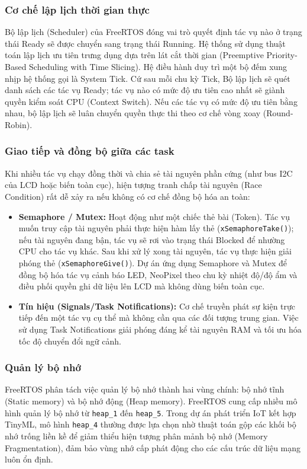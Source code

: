 \subsubsection{Cơ chế lập lịch thời gian thực}
Bộ lập lịch (Scheduler) của FreeRTOS đóng vai trò quyết định tác vụ nào ở trạng thái Ready sẽ được chuyển sang trạng thái Running. Hệ thống sử dụng thuật toán lập lịch ưu tiên trưng dụng dựa trên lát cắt thời gian (Preemptive Priority-Based Scheduling with Time Slicing). Hệ điều hành duy trì một bộ đếm xung nhịp hệ thống gọi là System Tick. Cứ sau mỗi chu kỳ Tick, Bộ lập lịch sẽ quét danh sách các tác vụ Ready; tác vụ nào có mức độ ưu tiên cao nhất sẽ giành quyền kiểm soát CPU (Context Switch). Nếu các tác vụ có mức độ ưu tiên bằng nhau, bộ lập lịch sẽ luân chuyển quyền thực thi theo cơ chế vòng xoay (Round-Robin).

\subsubsection{Giao tiếp và đồng bộ giữa các task}
Khi nhiều tác vụ chạy đồng thời và chia sẻ tài nguyên phần cứng (như bus I2C của LCD hoặc biến toàn cục), hiện tượng tranh chấp tài nguyên (Race Condition) rất dễ xảy ra nếu không có cơ chế đồng bộ hóa an toàn:
\begin{itemize}
    \item \textbf{Semaphore / Mutex:} Hoạt động như một chiếc thẻ bài (Token). Tác vụ muốn truy cập tài nguyên phải thực hiện hàm lấy thẻ (\texttt{xSemaphoreTake()}); nếu tài nguyên đang bận, tác vụ sẽ rơi vào trạng thái Blocked để nhường CPU cho tác vụ khác. Sau khi xử lý xong tài nguyên, tác vụ thực hiện giải phóng thẻ (\texttt{xSemaphoreGive()}). Dự án ứng dụng Semaphore và Mutex để đồng bộ hóa tác vụ cảnh báo LED, NeoPixel theo chu kỳ nhiệt độ/độ ẩm và điều phối quyền ghi dữ liệu lên LCD mà không dùng biến toàn cục.
    \item \textbf{Tín hiệu (Signals/Task Notifications):} Cơ chế truyền phát sự kiện trực tiếp đến một tác vụ cụ thể mà không cần qua các đối tượng trung gian. Việc sử dụng Task Notifications giải phóng đáng kể tài nguyên RAM và tối ưu hóa tốc độ chuyển đổi ngữ cảnh.
\end{itemize}

\subsubsection{Quản lý bộ nhớ}
FreeRTOS phân tách việc quản lý bộ nhớ thành hai vùng chính: bộ nhớ tĩnh (Static memory) và bộ nhớ động (Heap memory). FreeRTOS cung cấp nhiều mô hình quản lý bộ nhớ từ \texttt{heap\_1} đến \texttt{heap\_5}. Trong dự án phát triển IoT kết hợp TinyML, mô hình \texttt{heap\_4} thường được lựa chọn nhờ thuật toán gộp các khối bộ nhớ trống liền kề để giảm thiểu hiện tượng phân mảnh bộ nhớ (Memory Fragmentation), đảm bảo vùng nhớ cấp phát động cho các cấu trúc dữ liệu mạng luôn ổn định.

